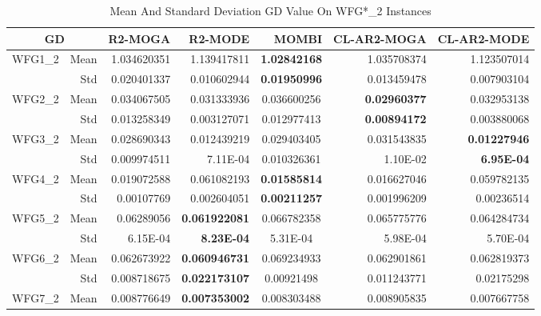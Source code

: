 \begin{table*}[htbp]
  \centering
  \caption{Mean And Standard Deviation GD Value On WFG*\_2 Instances}
    \begin{tabular}{rrrrrrr}
    \toprule
    \multicolumn{2}{c}{GD} & R2-MOGA & R2-MODE & MOMBI & CL-AR2-MOGA & CL-AR2-MODE \\
    \midrule
    \multirow{2}[0]{*}{WFG1\_2} & Mean  & 1.034620351 & 1.139417811 & \multicolumn{1}{c}{\textbf{1.02842168}} & 1.035708374 & 1.123507014 \\
          & Std   & 0.020401337 & 0.010602944 & \multicolumn{1}{c}{\textbf{0.01950996}} & 0.013459478 & 0.007903104 \\
    \multirow{2}[0]{*}{WFG2\_2} & Mean  & 0.034067505 & 0.031333936 & \multicolumn{1}{c}{0.036600256} & \textbf{0.02960377} & 0.032953138 \\
          & Std   & 0.013258349 & 0.003127071 & \multicolumn{1}{c}{0.012977413} & \textbf{0.00894172} & 0.003880068 \\
    \multirow{2}[0]{*}{WFG3\_2} & Mean  & 0.028690343 & 0.012439219 & \multicolumn{1}{c}{0.029403405} & 0.031543835 & \textbf{0.01227946} \\
          & Std   & 0.009974511 & 7.11E-04 & \multicolumn{1}{c}{0.010326361} & 1.10E-02 & \textbf{6.95E-04} \\
    \multirow{2}[0]{*}{WFG4\_2} & Mean  & 0.019072588 & 0.061082193 & \multicolumn{1}{c}{\textbf{0.01585814}} & 0.016627046 & 0.059782135 \\
          & Std   & 0.00107769 & 0.002604051 & \multicolumn{1}{c}{\textbf{0.00211257}} & 0.001996209 & 0.00236514 \\
    \multirow{2}[0]{*}{WFG5\_2} & Mean  & 0.06289056 & \textbf{0.061922081} & \multicolumn{1}{c}{0.066782358} & 0.065775776 & 0.064284734 \\
          & Std   & 6.15E-04 & \textbf{8.23E-04} & \multicolumn{1}{c}{5.31E-04} & 5.98E-04 & 5.70E-04 \\
    \multirow{2}[0]{*}{WFG6\_2} & Mean  & 0.062673922 & \textbf{0.060946731} & \multicolumn{1}{c}{0.069234933} & 0.062901861 & 0.062819373 \\
          & Std   & 0.008718675 & \textbf{0.022173107} & \multicolumn{1}{c}{0.00921498} & 0.011243771 & 0.02175298 \\
    \multirow{2}[0]{*}{WFG7\_2} & Mean  & 0.008776649 & \textbf{0.007353002} & \multicolumn{1}{c}{0.008303488} & 0.008905835 & 0.007667758 \\

\end{tabular}
\end{table*}
